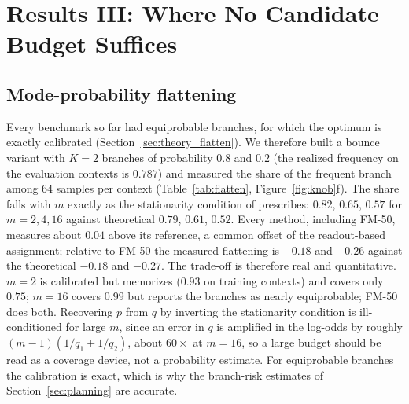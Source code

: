\section{Results III: Where No Candidate Budget Suffices}
\label{sec:results3}

\subsection{Mode-probability flattening}
\label{sec:flatten}
Every benchmark so far had equiprobable branches, for which the \nom{} optimum is exactly calibrated (Section~\ref{sec:theory_flatten}). We therefore built a bounce variant with $K{=}2$ branches of probability $0.8$ and $0.2$ (the realized frequency on the evaluation contexts is $0.787$) and measured the share of the frequent branch among 64 samples per context (Table~\ref{tab:flatten}, Figure~\ref{fig:knob}f). The share falls with $m$ exactly as the stationarity condition of \citet{bennett2026freedom} prescribes: $0.82$, $0.65$, $0.57$ for $m = 2, 4, 16$ against theoretical $0.79$, $0.61$, $0.52$. Every method, including FM-50, measures about $0.04$ above its reference, a common offset of the readout-based assignment; relative to FM-50 the measured flattening is $-0.18$ and $-0.26$ against the theoretical $-0.18$ and $-0.27$. The trade-off is therefore real and quantitative. $m{=}2$ is calibrated but memorizes ($0.93$ on training contexts) and covers only $0.75$; $m{=}16$ covers $0.99$ but reports the branches as nearly equiprobable; FM-50 does both. Recovering $p$ from $q$ by inverting the stationarity condition is ill-conditioned for large $m$, since an error in $q$ is amplified in the log-odds by roughly $(m-1)(1/q_1 + 1/q_2)$, about $60\times$ at $m{=}16$, so a large budget should be read as a coverage device, not a probability estimate. For equiprobable branches the calibration is exact, which is why the branch-risk estimates of Section~\ref{sec:planning} are accurate.

